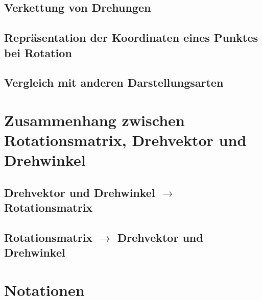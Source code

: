 \documentclass[a4paper, 11pt, accentcolor = tud3b]{tudreport}
\begin{document}
		\section{Verkettung von Drehungen} %

		\section{Repräsentation der Koordinaten eines Punktes bei Rotation} %

		\section{Vergleich mit anderen Darstellungsarten} %

	\chapter{Zusammenhang zwischen Rotationsmatrix, Drehvektor und Drehwinkel} %

		\section{Drehvektor und Drehwinkel \(\to\) Rotationsmatrix} %

		\section{Rotationsmatrix \(\to\) Drehvektor und Drehwinkel} %

	\chapter{Notationen} %
\end{document}

